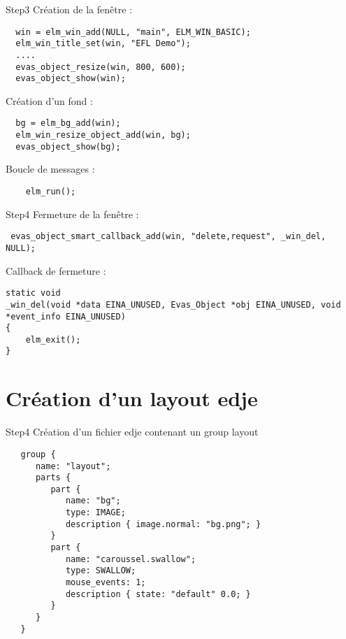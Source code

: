\documentclass{beamer}
\newcounter{image}
\begin{document}
\begin{frame}[fragile]{Step3}
Création de la fenêtre :
\begin{lstlisting}
  win = elm_win_add(NULL, "main", ELM_WIN_BASIC);
  elm_win_title_set(win, "EFL Demo");
  ....
  evas_object_resize(win, 800, 600);
  evas_object_show(win);
\end{lstlisting}

Création d'un fond :
\begin{lstlisting}
  bg = elm_bg_add(win);
  elm_win_resize_object_add(win, bg);
  evas_object_show(bg);
\end{lstlisting}


Boucle de messages :
\begin{lstlisting}
    elm_run();
\end{lstlisting}
\end{frame}

\begin{frame}[fragile]{Step4}
Fermeture de la fenêtre :
\begin{lstlisting}
 evas_object_smart_callback_add(win, "delete,request", _win_del, NULL);
\end{lstlisting}

Callback de fermeture :
\begin{lstlisting}
static void
_win_del(void *data EINA_UNUSED, Evas_Object *obj EINA_UNUSED, void *event_info EINA_UNUSED)
{
    elm_exit();
}
\end{lstlisting}
\end{frame}

\section{Création d'un layout edje}
\begin{frame}[fragile]{Step4}
Création d'un fichier edje contenant un group layout
\begin{lstlisting}
   group {
      name: "layout";
      parts {
         part {
            name: "bg";
            type: IMAGE;
            description { image.normal: "bg.png"; }
         }
         part {
            name: "caroussel.swallow";
            type: SWALLOW;
            mouse_events: 1;
            description { state: "default" 0.0; }
         }
      }
   }
\end{lstlisting}
\end{frame}
\end{document}
